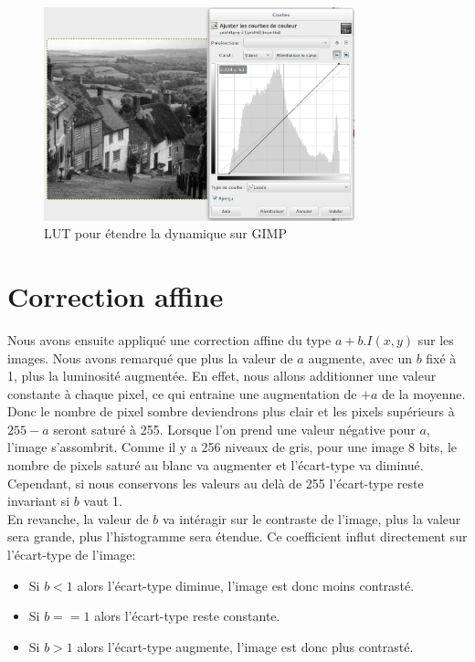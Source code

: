 \documentclass[a4paper,11pt]{article}
\begin{document}
    \begin{figure}[H]
    \center
    \includegraphics[width=9cm]{LUT-Q1.png}
    \caption{LUT pour étendre la dynamique sur GIMP}
  \end{figure}
  
  \section{Correction affine}
  Nous avons ensuite appliqué une correction affine du type $a+b.I(x,y)$ sur les images.
  Nous avons remarqué que plus la valeur de $a$ augmente, avec un $b$ fixé à 1, plus la 
  luminosité augmentée. En effet, nous allons additionner une valeur constante à chaque 
  pixel, ce qui entraine une augmentation de $+a$ de la moyenne. Donc le nombre de pixel 
  sombre deviendrons plus clair et les pixels supérieurs à $255-a$ seront saturé à 255. 
  Lorsque l'on prend une valeur négative pour $a$, l'image s'assombrit. Comme il y a 256 
  niveaux de gris, pour une image 8 bits, le nombre de pixels saturé au blanc va augmenter
  et l'écart-type va diminué. Cependant, si nous conservons les valeurs au delà de 255 
  l'écart-type reste invariant si $b$ vaut 1.\\
  
  En revanche, la valeur de $b$ va intéragir sur le contraste de l'image, plus la valeur 
  sera grande, plus l'histogramme sera étendue. Ce coefficient influt directement sur 
  l'écart-type de l'image:
  \begin{itemize}
   \item Si $b<1$ alors l'écart-type diminue, l'image est donc moins contrasté.
   \item Si $b==1$ alors l'écart-type reste constante.
   \item Si $b>1$ alors l'écart-type augmente, l'image est donc plus contrasté.
  \end{itemize}
  \ \\
  
\end{document}
